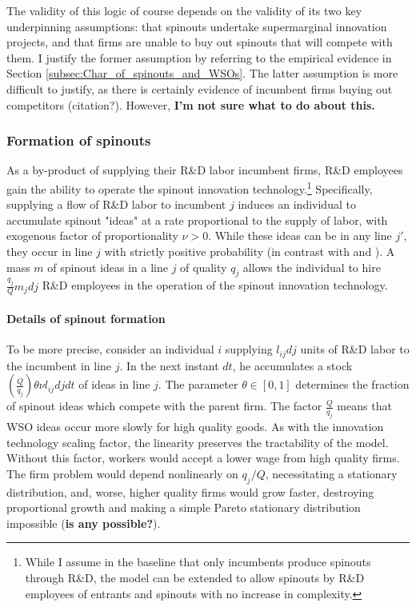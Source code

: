 \documentclass[12pt,english]{article}
\theoremstyle{remark}
\begin{document}
The validity of this logic of course depends on the validity of its two key underpinning assumptions: that spinouts undertake supermarginal innovation projects, and that firms are unable to buy out spinouts that will compete with them. I justify the former assumption by referring to the empirical evidence in Section \ref{subsec:Char_of_spinouts_and_WSOs}. The latter assumption is more difficult to justify, as there is certainly evidence of incumbent firms buying out competitors (citation?). However, \textbf{I'm not sure what to do about this.}

\subsubsection{Formation of spinouts} 

As a by-product of supplying their R\&D labor incumbent firms, R\&D employees gain the ability to operate the spinout innovation technology.\footnote{While I assume in the baseline that only incumbents produce spinouts through R\&D, the model can be extended to allow spinouts by R\&D employees of entrants and spinouts with no increase in complexity.} Specifically, supplying a flow of R\&D labor to incumbent $j$ induces an individual to accumulate spinout "ideas" at a rate proportional to the supply of labor, with exogenous factor of proportionality $\nu > 0$. While these ideas can be in any line $j'$, they occur in line $j$ with strictly positive probability (in contrast with \cite{franco_spin-outs:_2006} and \cite{baslandze_spinout_2019}). A mass $m$ of spinout ideas in a line $j$ of quality $q_j$ allows the individual to hire $\frac{q_j}{Q}m_jdj$ R\&D employees in the operation of the spinout innovation technology. 

\paragraph{Details of spinout formation}

To be more precise, consider an individual $i$ supplying $l_{ij}dj$ units of R\&D labor to the incumbent in line $j$. In the next instant $dt$, he accumulates a stock $(\frac{Q}{q_j}) \theta \nu l_{ij} dj dt$ of ideas in line $j$. The parameter $\theta \in [0,1]$ determines the fraction of spinout ideas which compete with the parent firm. The factor $\frac{Q}{q_j}$ means that WSO ideas occur more slowly for high quality goods. As with the innovation technology scaling factor, the linearity preserves the tractability of the model. Without this factor, workers would accept a lower wage from high quality firms. The firm problem would depend nonlinearly on $q_j/Q$, necessitating a stationary distribution, and, worse, higher quality firms would grow faster, destroying proportional growth and making a simple Pareto stationary distribution impossible (\textbf{is any possible?}). 
\end{document}
